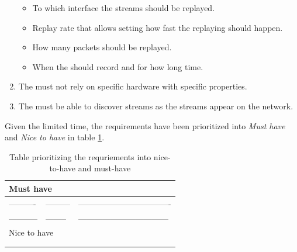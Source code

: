 \begin{enumerate}
\begin{itemize}
		\item To which interface the streams should be replayed. 
		\item Replay rate that allows setting how fast the replaying should happen. 
		\item How many packets should be replayed.
		\item When the  should record and for how long time.
	\end{itemize}
	\item The  must not rely on specific hardware with specific properties.
	\item The  must be able to discover streams as the streams appear on the network.
\end{enumerate}

Given the limited time, the requirements have been prioritized into \textit{Must have} and \textit{Nice to have} in table \ref{sec:analysis:historian:tablefeatures}.
\begin{table}[h!]
\centering
\caption{Table prioritizing the requriements into nice-to-have and must-have}
\label{sec:analysis:historian:tablefeatures}
\begin{tabular}{l|l|l}

\multicolumn{3}{l}{Must have}              \\ \hline
----------  & --------- & ---------------------------------- \\ \hline
----------- & --------  & --------------------------------- \\ \hline
\multicolumn{3}{l}{Nice to have}              \\ \hline
            &           &                       \\ \hline
            &           &                       \\ \hline
\end{tabular}
\end{table}


